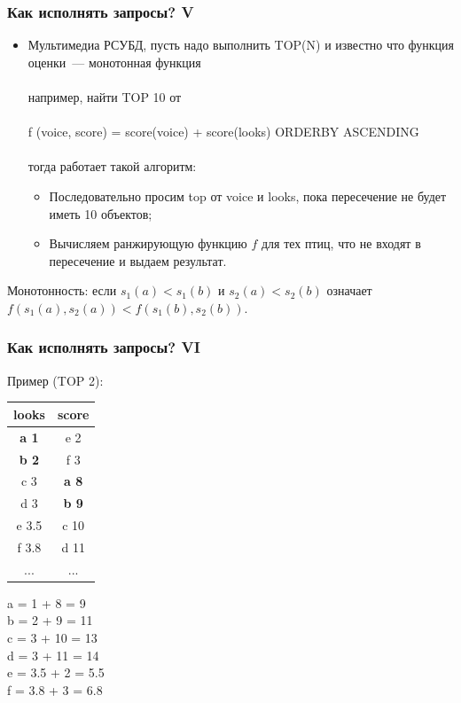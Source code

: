 \documentclass{beamer}
\begin{document}
\begin{frame}
\frametitle{Как исполнять запросы? V}

\begin{itemize}
  \setlength\itemsep{1em}

  \item Мультимедиа РСУБД, пусть надо выполнить TOP(N) и известно что функция оценки~--- монотонная функция\\~\\например, найти TOP 10 от\\~\\ f (voice, score) = score(voice) + score(looks) ORDERBY ASCENDING\\~\\
  тогда работает такой алгоритм:
  \begin{itemize}
    \item Последовательно просим top от voice и looks, пока пересечение не будет иметь 10 объектов;
    \item Вычисляем ранжирующую функцию $f$ для тех птиц, что не входят в пересечение и выдаем результат.
  \end{itemize}
  
\end{itemize}

Монотонность: если $s_1(a)<s_1(b)$ и $s_2(a)<s_2(b)$ означает $f(s_1(a),
s_2(a)) < f(s_1(b), s_2(b))$.

\end{frame}

\begin{frame}
\frametitle{Как исполнять запросы? VI}

Пример (TOP 2):

\begin{multicols}{2}
\begin{center}
	\begin{tabular}{ | c | c | }
		\hline
		looks & score  \\ \hline
		\alert{\textbf{a 1}} & \alert{e 2} \\ \hline
		\alert{\textbf{b 2}} & \alert{f 3} \\ \hline
		\alert{c 3} & \alert{\textbf{a 8}} \\ \hline
		\alert{d 3} & \alert{\textbf{b 9}} \\ \hline
		e 3.5       & c 10 \\ \hline        
		f 3.8       & d 11 \\ \hline
		... & ... \\ \hline
	\end{tabular}
\end{center}
	\columnbreak
a = 1 + 8 = 9\\
b = 2 + 9 = 11\\
c = 3 + 10 = 13\\
d = 3 + 11 = 14\\
\alert{e = 3.5 + 2 = 5.5}\\
\alert{f = 3.8 + 3 = 6.8}
	
\end{multicols}


\end{frame}
\end{document}
